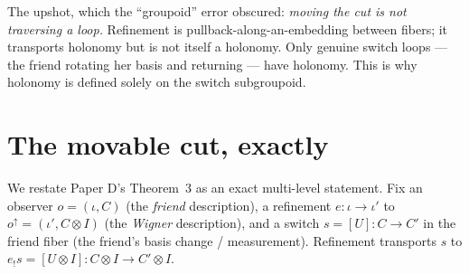 \documentclass[11pt]{article}
\theoremstyle{definition}
\theoremstyle{remark}
\newcommand{\pushf}[1]{{#1}_{!}}
\begin{document}
\noindent
The upshot, which the ``groupoid'' error obscured: \emph{moving the cut is not
traversing a loop.} Refinement is pullback-along-an-embedding between fibers; it
transports holonomy but is not itself a holonomy. Only genuine switch loops --- the
friend rotating her basis and returning --- have holonomy. This is why holonomy is
defined solely on the switch subgroupoid.

\section{The movable cut, exactly}\label{sec:cut}

We restate Paper D's Theorem~3 as an exact multi-level statement. Fix an observer
$o=(\iota,C)$ (the \emph{friend} description), a refinement $e:\iota\to\iota'$ to
$o^\uparrow=(\iota',C\otimes I)$ (the \emph{Wigner} description), and a switch
$s=[U]:C\to C'$ in the friend fiber (the friend's basis change / measurement).
Refinement transports $s$ to $\pushf e s=[U\otimes I]:C\otimes I\to C'\otimes I$.
\end{document}
